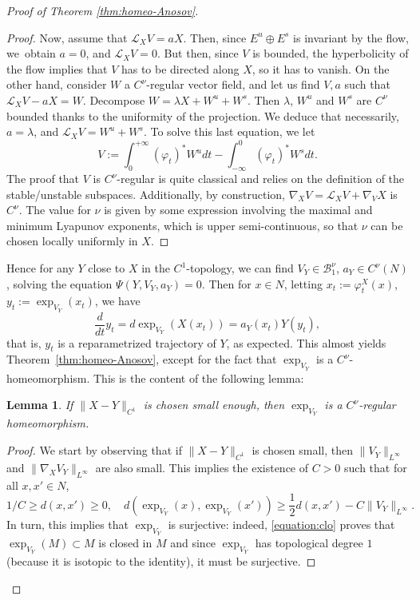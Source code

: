 \documentclass[10pt]{amsart}
\theoremstyle{plain}
\newtheorem{lemma}{Lemma}[section]
\theoremstyle{definition}
\begin{document}
\begin{proof}[Proof of Theorem \ref{thm:homeo-Anosov}]
\begin{proof}
Now, assume that $\mathcal{L}_X V = a X$. Then, since $E^u\oplus E^s$ is invariant by the flow, we~obtain $a=0$, and $\mathcal{L}_X V = 0$. But then, since $V$ is bounded, the hyperbolicity of the flow implies that $V$ has to be directed along $X$, so it has to vanish. On the other hand, consider $W$ a $C^\nu$-regular vector field, and let us find $V,a$ such that $\mathcal{L}_X V - aX = W$. Decompose $W = \lambda X + W^u + W^s$. Then $\lambda$, $W^u$ and $W^s$ are $C^\nu$ bounded thanks to the uniformity of the projection. We deduce that necessarily, $a = \lambda$, and $\mathcal{L}_X V= W^u + W^s$. To solve this last equation, we let
\[
V := \int_0^{+\infty}(\varphi_t)^\ast W^u dt -\int_{-\infty}^0 (\varphi_t)^\ast W^s dt.
\]
The proof that $V$ is $C^\nu$-regular is quite classical and relies on the definition of the stable/unstable subspaces. Additionally, by construction, $\nabla_X V = \mathcal{L}_X V + \nabla_V X$ is~$C^\nu$. The value for $\nu$ is given by some expression involving the maximal and minimum Lyapunov exponents, which is upper semi-continuous, so that $\nu$ can be chosen locally uniformly in $X$.
\end{proof}

Hence for any $Y$ close to $X$ in the $C^1$-topology, we can find $V_Y \in \mathcal{B}_1^\nu$, $a_Y \in C^\nu(N)$, solving the equation $\Psi(Y,V_Y, a_Y) = 0$. Then for $x\in N$, letting $x_t := \varphi_t^X(x)$, $y_t := \exp_{V_Y}(x_t)$, we have
\[
\frac{d}{dt}y_t = d \exp_{V_Y}(X (x_t)) = a_Y(x_t) Y(y_t),
\]
that is, $y_t$ is a reparametrized trajectory of $Y$, as expected. This almost yields Theorem~\ref{thm:homeo-Anosov}, except for the fact that $\exp_{V_Y}$ is a $C^\nu$-homeomorphism. This is the content of the following lemma:

\begin{lemma}
\label{lemma:hom}
If $\|X-Y\|_{C^1}$ is chosen small enough, then $\exp_{V_Y}$ is a $C^\nu$-regular homeomorphism.
\end{lemma}

\begin{proof}
We start by observing that if $\|X-Y\|_{C^1}$ is chosen small, then $\|V_Y\|_{L^\infty}$ and $\|\nabla_X V_Y\|_{L^\infty}$ are also small. This implies the existence of $C > 0$ such that for all $x,x' \in N$,
\begin{equation}
\label{equation:clo}
1/C \geq d(x,x')\geq 0,\quad d(\exp_{V_Y}(x), \exp_{V_Y}(x')) \geq \frac{1}{2} d(x,x') - C\|V_Y\|_{L^\infty}.
\end{equation}
In turn, this implies that $\exp_{V_Y}$ is surjective: indeed, \eqref{equation:clo} proves that $\exp_{V_Y}(M) \subset M$ is closed in $M$ and since $\exp_{V_Y}$ has topological degree $1$ (because it is isotopic to the identity), it must be surjective.


\end{proof}
\end{proof}
\end{document}
